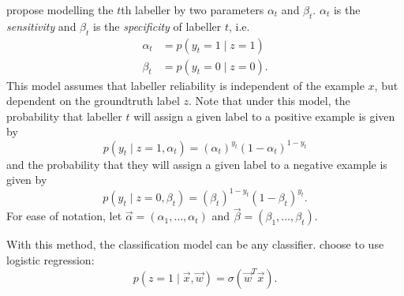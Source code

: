 
            \citet{raykar10} propose modelling the $t$th labeller by two parameters $\alpha_t$ and $\beta_t$. $\alpha_t$ is the \emph{sensitivity} and $\beta_t$ is the \emph{specificity} of labeller $t$, i.e.
            \begin{align*}
                \alpha_t &= p(y_t = 1 \mid z = 1)\\
                \beta_t &= p(y_t = 0 \mid z = 0).
            \end{align*}
            This model assumes that labeller reliability is independent of the example $x$, but dependent on the groundtruth label $z$. Note that under this model, the probability that labeller $t$ will assign a given label to a positive example is given by
            \begin{equation*}
                p(y_t \mid z = 1, \alpha_t) = (\alpha_t)^{y_t} (1 - \alpha_t)^{1 - y_t}
            \end{equation*}
            and the probability that they will assign a given label to a negative example is given by
            \begin{equation*}
                p(y_t \mid z = 0, \beta_t) = (\beta_t)^{1 - y_t} (1 - \beta_t)^{y_t}.
            \end{equation*}
            For ease of notation, let $\vec \alpha = (\alpha_1, \dots, \alpha_t)$ and $\vec \beta = (\beta_1, \dots, \beta_t)$.

            With this method, the classification model can be any classifier. \citeauthor{raykar10} choose to use logistic regression:
            \begin{equation}
                \label{eq:raykar-logreg}
                p(z = 1 \mid \vec x, \vec w) = \sigma(\vec w^T \vec x).
            \end{equation}

